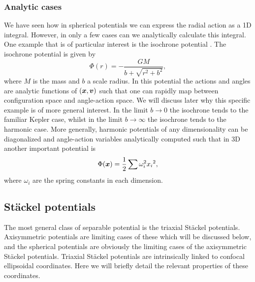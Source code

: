 \documentclass[useAMS,usenatbib,fleqn,a4paper]{mn2e}
\newcommand{\bs}[1]{\bmath{#1}}
\begin{document}
\subsubsection{Analytic cases}\label{Sect::analytic}
We have seen how in spherical potentials we can express the radial action as a 1D integral. However, in only a few cases can we analytically calculate this integral. One example that is of particular interest is the isochrone potential \citep{Henon}. The isochrone potential is given by
\begin{equation}
\Phi(r) = -\frac{GM}{b+\sqrt{r^2+b^2}},
\end{equation}
where $M$ is the mass and $b$ a scale radius. In this potential the actions and angles are analytic functions of $(\bs{x},\bs{v})$ such that one can rapidly map between configuration space and angle-action space. We will discuss later why this specific example is of more general interest. In the limit $b\rightarrow0$ the isochrone tends to the familiar Kepler case, whilst in the limit $b\rightarrow\infty$ the isochrone tends to the harmonic case. More generally, harmonic potentials of any dimensionality can be diagonalized and angle-action variables analytically computed such that in 3D another important potential is
\begin{equation}
\Phi(\bs{x}) = \frac{1}{2}\sum\omega_i^2{x_i}^2,
\end{equation}
where $\omega_i$ are the spring constants in each dimension.


\subsection{St\"ackel potentials}\label{StackelPot}
The most general class of separable potential is the triaxial St\"ackel potentials. Axisymmetric potentials are limiting cases of these which will be discussed below, and the spherical potentials are obviously the limiting cases of the axisymmetric St\"ackel potentials. Triaxial St\"ackel potentials are intrinsically linked to confocal ellipsoidal coordinates. Here we will briefly detail the relevant properties of these coordinates.
\end{document}
